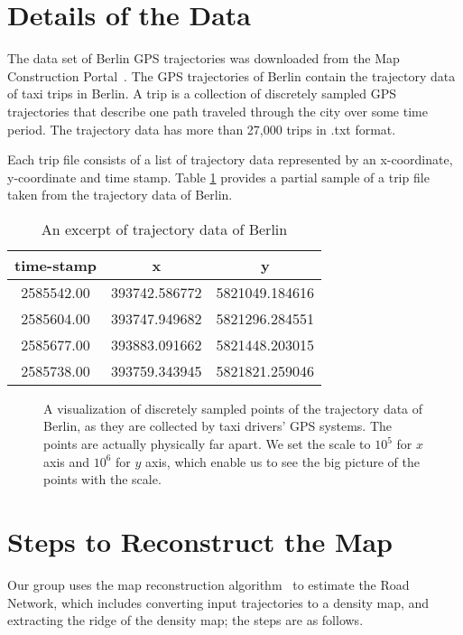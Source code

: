 \documentclass[11pt]{article}
\begin{document}
\section*{Details of the Data}
\par
The data set of Berlin GPS trajectories was downloaded from the Map Construction Portal~\cite{link}. The GPS trajectories of Berlin contain the trajectory data of taxi trips in Berlin. A trip is a collection of discretely sampled GPS trajectories that describe one path traveled through the city over some time period. The trajectory data has more than 27,000 trips in .txt format. 
\par
Each trip file consists of a list of trajectory data represented by an x-coordinate, y-coordinate and time stamp. Table \ref{table:questions} provides a partial sample of a trip file taken from the trajectory data of Berlin.
\begin{table}[h!]
\begin{center}
\begin{tabular}{ |c |c| c| }
\hline
  time-stamp & x & y    \\ \hline
  2585542.00 & 393742.586772 & 5821049.184616    \\ \hline
  2585604.00 & 393747.949682 & 5821296.284551  \\  \hline
  2585677.00 & 393883.091662 & 5821448.203015  \\ \hline
  2585738.00 & 393759.343945 & 5821821.259046  \\ \hline
\end{tabular}
\end{center}
\caption{An excerpt of trajectory data of Berlin}
\label{table:questions}
\end{table}





\begin{figure}[H]
  \caption{A visualization of discretely sampled points of the trajectory data of Berlin, as they are collected by taxi drivers' GPS systems. The points are actually physically far apart. We set the scale to $10^5$ for $x$ axis and $10^6$ for $y$ axis, which enable us to see the big picture of the points with the scale.}
  \centering
\end{figure}

\section*{Steps to Reconstruct the Map}
\par
Our group uses the map reconstruction algorithm~\cite{Wang15} to estimate the Road Network, which includes converting input trajectories to a density map, and  extracting the ridge of the 
density map; the  steps are as follows.   
\end{document}
